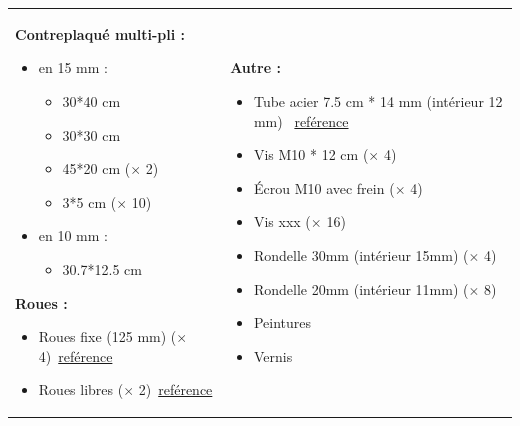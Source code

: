\documentclass[a4paper,oneside]{article}
\begin{document}
\begin{tabular}{l l}
\begin{minipage}{0.5\linewidth}

\textbf{Contreplaqué multi-pli :}
 \begin{itemize}[label=$\bullet$]
\item en 15 mm :
\begin{itemize}
\item 30*40 cm
\item 30*30 cm
\item 45*20 cm ($\times$ 2)
\item 3*5 cm ($\times$ 10)
\end{itemize}
\item en 10 mm :
\begin{itemize}
\item 30.7*12.5 cm
\end{itemize}
\end{itemize}

\textbf{Roues :}
\begin{itemize}
\item Roues fixe (125 mm) ($\times$ 4)~\href{http://www.leroymerlin.fr/v3/p/produits/roue-fixe-sur-axe-pour-manutention-diametre-125-mm-e21277}{reférence}
\item Roues libres ($\times$ 2)~\href{http://www.leroymerlin.fr/v3/p/produits/roulette-pivotante-a-platine-pour-ameublement-diametre-50-mm-e21285}{reférence}
\end{itemize}
\end{minipage}
&
\begin{minipage}{0.5\linewidth}
\textbf{Autre :}
\begin{itemize}
\item Tube acier 7.5 cm * 14 mm (intérieur 12 mm) ~\href{http://www.leroymerlin.fr/v3/p/produits/tube-rond-lisse-en-acier-brut-l1m-x-ep0-1cm-d1-4cm-e17176}{reférence}
\item Vis M10 * 12 cm ($\times$ 4)
\item Écrou M10 avec frein ($\times$ 4)
\item Vis xxx ($\times$ 16)
\item Rondelle 30mm (intérieur 15mm) ($\times$ 4)
\item Rondelle 20mm (intérieur 11mm) ($\times$ 8)
\item Peintures
\item Vernis
\end{itemize}
\end{minipage}
\end{tabular}
\end{document}
